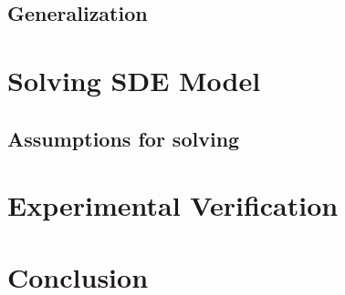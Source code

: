 \documentclass[12pt]{article}
\theoremstyle{definition}
\numberwithin{equation}{section}
\begin{document}
\subsection{Generalization}
\section{Solving SDE Model}
\label{sec:SolvingSDEModel}
\subsection{Assumptions for solving}
\section{Experimental Verification} 
\label{sec:ExperimentalVerification}
\section{Conclusion}

\printbibliography
\end{document}

